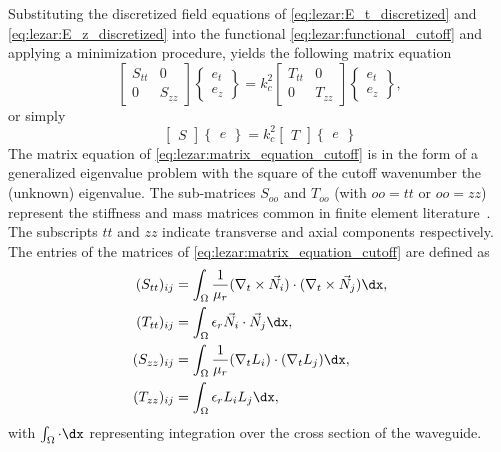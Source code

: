 Substituting the discretized field equations of \eqref{eq:lezar:E_t_discretized} and \eqref{eq:lezar:E_z_discretized} into the functional \eqref{eq:lezar:functional_cutoff} and applying a minimization procedure, yields the following matrix equation~\citep{Davidson2011}
\begin{equation}
    \label{eq:lezar:matrix_equation_cutoff}
    \begin{bmatrix} S_{tt} & 0\\0 & S_{zz}\end{bmatrix} \begin{Bmatrix}e_t\\e_z\end{Bmatrix} = k_c^2 \begin{bmatrix}T_{tt} & 0\\0 &   T_{zz}\end{bmatrix}\begin{Bmatrix}e_t\\e_z\end{Bmatrix},
\end{equation}
or simply
\begin{equation}
  \begin{bmatrix}S\end{bmatrix}\begin{Bmatrix}e\end{Bmatrix} = k_c^2 \begin{bmatrix}T\end{bmatrix}\begin{Bmatrix}e\end{Bmatrix}
\end{equation}
The matrix equation of \eqref{eq:lezar:matrix_equation_cutoff} is in the form of a generalized eigenvalue problem with the square of the cutoff wavenumber the (unknown) eigenvalue. The sub-matrices $S_{oo}$ and $T_{oo}$ (with $oo = tt$ or $oo = zz$) represent the stiffness and mass matrices common in finite element literature~\citep{Davidson2011, Jin2002}. The subscripts $tt$ and $zz$ indicate transverse and axial components respectively. The entries of the matrices of \eqref{eq:lezar:matrix_equation_cutoff} are defined as~\citep{PelosiCoccioliSelleri1998, Jin2002}
\begin{align}
\label{eq:lezar:S_tt_ij}
(S_{tt})_{ij} &= \int_\Omega \frac{1}{\mu_r}(\nabla_t\times\vec{N}_i)\cdot(\nabla_t\times\vec{N}_j) \dx,\\
\label{eq:lezar:T_tt_ij}
(T_{tt})_{ij} &= \int_\Omega \epsilon_r\vec{N}_i\cdot\vec{N}_j \dx,\\
\label{eq:lezar:S_zz_ij}
(S_{zz})_{ij} &= \int_\Omega \frac{1}{\mu_r}(\nabla_t L_i)\cdot(\nabla_t L_j) \dx,\\
\label{eq:lezar:T_zz_ij}
(T_{zz})_{ij} &= \int_\Omega \epsilon_r L_i L_j \dx,
\end{align}
with $\int_\Omega\cdot \dx$ representing integration over the cross section of the waveguide.

